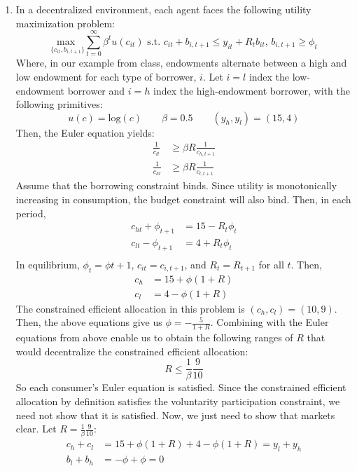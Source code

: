 \documentclass{article}
\newcommand{\loge}[1]{\text{log}\left(#1\right)}
\newcommand{\usmax}[1]{\underset{#1}{\text{max }}}
\begin{document}
\begin{enumerate}
	\item In a decentralized environment, each agent faces the following utility maximization problem:
		\[
			\usmax{\{c_{it},b_{i,t+1}\}}\sum_{t=0}^\infty\beta^tu(c_{it})\text{ s.t. }c_{it}+b_{i,t+1}\leq y_{it} + R_tb_{it}\text{, }b_{i,t+1}\geq\phi_t
		\]
		Where, in our example from class, endowments alternate between a high and low endowment for each type of borrower, $i$. Let ${i=l}$ index the low-endowment borrower and ${i=h}$ index the high-endowment borrower, with the following primitives:
		\[
			u(c) = \loge{c}\quad\quad \beta = 0.5 		\quad\quad (y_h,y_l) = (15,4)
		\]
		Then, the Euler equation yields:
		\begin{align*}
			\frac{1}{c_{lt}}	&\geq \beta R\frac{1}{c_{h,t+1}}	\\
			\frac{1}{c_{ht}}	&\geq \beta R\frac{1}{c_{l,t+1}}
		\end{align*}
		Assume that the borrowing constraint binds. Since utility is monotonically increasing in consumption, the budget constraint will also bind. Then, in each period,
		\begin{align*}
			c_{ht} + \phi_{t+1} &= 15 - R_t\phi_t	\\
			c_{lt} - \phi_{t+1} &= 4 + R_t\phi_t	\\
		\end{align*}
		In equilibrium, ${\phi_t=\phi{t+1}}$, ${c_{it}=c_{i,t+1}}$, and ${R_t = R_{t+1}}$ for all $t$. Then,
		\begin{align*}
			c_{h}	&= 15 + \phi(1+R)	\\
			c_{l} 	&= 4 - \phi(1+R)		
		\end{align*}
		The constrained efficient allocation in this problem is ${(c_h,c_l)=(10,9)}$. Then, the above equations give us ${\phi=-\frac{5}{1+R}}$. Combining with the Euler equations from above enable us to obtain the following ranges of $R$ that would decentralize the constrained efficient allocation:
		\[
			R\leq \frac{1}{\beta}\frac{9}{10}
		\]
		So each consumer's Euler equation is satisfied. Since the constrained efficient allocation by definition satisfies the voluntarity participation constraint, we need not show that it is satisfied. Now, we just need to show that markets clear. Let ${R=\frac{1}{\beta}\frac{9}{10}}$:
		\begin{align*}
			c_{h} + c_l	&= 15 + \phi(1+R) + 4 - \phi(1+R) = y_l + y_h	\\
			b_l + b_h	&= -\phi + \phi = 0
		\end{align*}
		

\end{enumerate}
\end{document}
